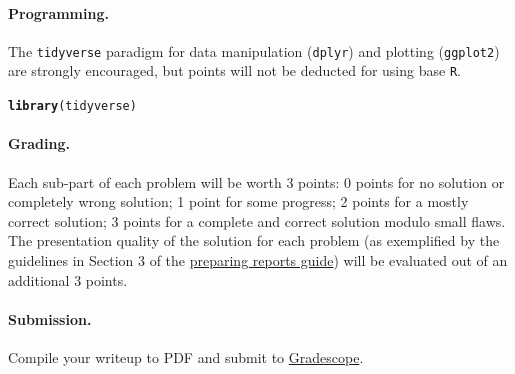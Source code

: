 \documentclass[11pt,letterpaper,english,oneside]{article}\usepackage[]{graphicx}\usepackage[]{color}
\makeatletter
\newcommand{\hlstd}[1]{\textcolor[rgb]{0.345,0.345,0.345}{#1}}%
\newcommand{\hlkwd}[1]{\textcolor[rgb]{0.737,0.353,0.396}{\textbf{#1}}}%
\newenvironment{kframe}{%
 \def\at@end@of@kframe{}%
 \ifinner\ifhmode%
  \def\at@end@of@kframe{\end{minipage}}%
  \begin{minipage}{\columnwidth}%
 \fi\fi%
 \def\FrameCommand##1{\hskip\@totalleftmargin \hskip-\fboxsep
 \colorbox{shadecolor}{##1}\hskip-\fboxsep
     \hskip-\linewidth \hskip-\@totalleftmargin \hskip\columnwidth}%
 \MakeFramed {\advance\hsize-\width
   \@totalleftmargin\z@ \linewidth\hsize
   \@setminipage}}%
 {\par\unskip\endMakeFramed%
 \at@end@of@kframe}
\newenvironment{knitrout}{}{} %
\theoremstyle{definition} %
\makeatother
\begin{document}
\paragraph{Programming.}

The \texttt{tidyverse} paradigm for data manipulation (\texttt{dplyr}) and plotting (\texttt{ggplot2}) are strongly encouraged, but points will not be deducted for using base \texttt{R}. 
\begin{knitrout}
\color{fgcolor}\begin{kframe}
\begin{alltt}
\hlkwd{library}\hlstd{(tidyverse)}
\end{alltt}
\end{kframe}
\end{knitrout}

\paragraph{Grading.} Each sub-part of each problem will be worth 3 points: 0 points for no solution or completely wrong solution; 1 point for some progress; 2 points for a mostly correct solution; 3 points for a complete and correct solution modulo small flaws. The presentation quality of the solution for each problem (as exemplified by the guidelines in Section 3 of the \href{https://github.com/Katsevich-Teaching/stat-961-fall-2021/blob/main/getting-started/preparing-reports.pdf}{preparing reports guide}) will be evaluated out of an additional 3 points.

\paragraph{Submission.} Compile your writeup to PDF and submit to \href{https://www.gradescope.com/courses/284562}{Gradescope}.

\clearpage
\end{document}
